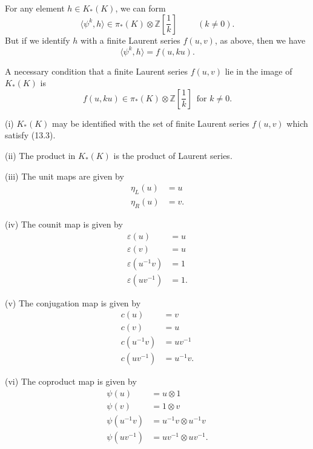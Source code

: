 \documentclass[../main]{subfiles}
\begin{document}
For any element $h\in K_\ast(K)$, we can form $$\langle\psi^k, h\rangle \in\pi_\ast(K)\otimes\mathbb{Z}\left[\frac{1}{k}\right]\hspace{1cm} (k\neq 0).$$
But if we identify $h$ with a finite Laurent series $f(u,v)$, as above, then we have 
\begin{equation}
\tag{13.1}
\langle\psi^k, h\rangle = f(u,ku).
\end{equation}
\begin{corollary}
\label{cor:pt2ch13.2}
A necessary condition that a finite Laurent series $f(u,v)$ lie in the image of $K_\ast(K)$ is 
\begin{equation}
\label{eqn:p2c13.3}
\tag{13.3}
f(u,ku)\in \pi_\ast(K)\otimes\mathbb{Z}\left[\frac{1}{k}\right] \,\text{ for } k\neq 0.
\end{equation}
\end{corollary}
\begin{theorem}
\label{thm:p2c13.4}
(i) $K_\ast(K)$ may be identified with the set of finite Laurent series $f(u,v)$ which satisfy (13.3). 

(ii) The product in $K_\ast(K)$ is the product of Laurent series.

(iii) The unit maps are given by 
\begin{align*}
    \eta_L(u) &= u\\
    \eta_R(u) &= v.
\end{align*}

(iv) The counit map is given by
\begin{align*}
    \varepsilon(u)&=u\\
    \varepsilon(v)&=u\\
    \varepsilon(u^{-1}v)&=1\\
    \varepsilon(uv^{-1})&=1.
\end{align*}

(v) The conjugation map is given by
\begin{align*}
    c(u)&=v\\
    c(v)&=u\\
    c(u^{-1}v)&=uv^{-1}\\
    c(uv^{-1})&=u^{-1}v.
\end{align*}

(vi) The coproduct map is given by
\begin{align*}
    \psi(u)&=u\otimes 1\\
    \psi(v)&=1\otimes v\\
    \psi(u^{-1}v)&=u^{-1}v\otimes u^{-1}v\\
    \psi(uv^{-1})&=uv^{-1}\otimes uv^{-1}.
\end{align*}
\end{theorem}
\end{document}
